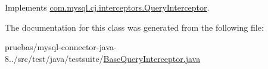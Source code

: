 Implements \mbox{\hyperlink{interfacecom_1_1mysql_1_1cj_1_1interceptors_1_1_query_interceptor_a1613f5491fdb4610d5727d60c904e7e2}{com.\+mysql.\+cj.\+interceptors.\+Query\+Interceptor}}.



The documentation for this class was generated from the following file\+:\begin{DoxyCompactItemize}
\item 
pruebas/mysql-\/connector-\/java-\/8../src/test/java/testsuite/\mbox{\hyperlink{_base_query_interceptor_8java}{Base\+Query\+Interceptor.\+java}}\end{DoxyCompactItemize}
